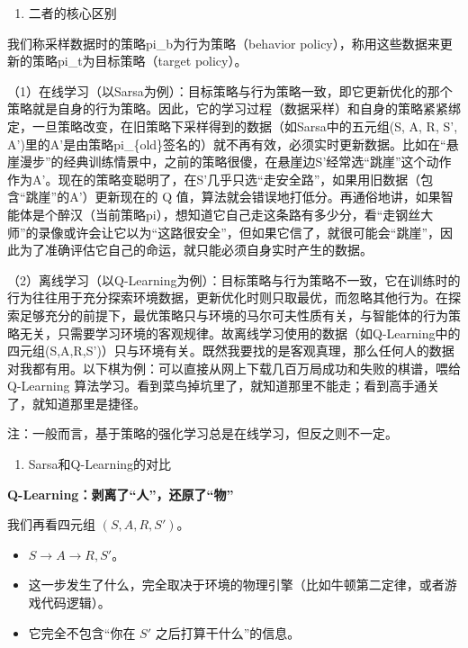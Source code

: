 \begin{enumerate}
\def\labelenumi{\arabic{enumi}.}
\tightlist
\item
  二者的核心区别
\end{enumerate}

我们称采样数据时的策略pi\_b为行为策略（behavior policy），称用这些数据来更新的策略pi\_t为目标策略（target policy）。

（1）在线学习（以Sarsa为例）：目标策略与行为策略一致，即它更新优化的那个策略就是自身的行为策略。因此，它的学习过程（数据采样）和自身的策略紧紧绑定，一旦策略改变，在旧策略下采样得到的数据（如Sarsa中的五元组(S, A, R, S', A')里的A'是由策略pi\_\{old\}签名的）就不再有效，必须实时更新数据。比如在``悬崖漫步''的经典训练情景中，之前的策略很傻，在悬崖边S'经常选``跳崖''这个动作作为A'。现在的策略变聪明了，在S'几乎只选``走安全路''，如果用旧数据（包含``跳崖''的A'）更新现在的 Q 值，算法就会错误地打低分。再通俗地讲，如果智能体是个醉汉（当前策略pi），想知道它自己走这条路有多少分，看``走钢丝大师''的录像或许会让它以为``这路很安全''，但如果它信了，就很可能会``跳崖''，因此为了准确评估它自己的命运，就只能必须自身实时产生的数据。

（2）离线学习（以Q-Learning为例）：目标策略与行为策略不一致，它在训练时的行为往往用于充分探索环境数据，更新优化时则只取最优，而忽略其他行为。在探索足够充分的前提下，最优策略只与环境的马尔可夫性质有关，与智能体的行为策略无关，只需要学习环境的客观规律。故离线学习使用的数据（如Q-Learning中的四元组(S,A,R,S')）只与环境有关。既然我要找的是客观真理，那么任何人的数据对我都有用。以下棋为例：可以直接从网上下载几百万局成功和失败的棋谱，喂给 Q-Learning 算法学习。看到菜鸟掉坑里了，就知道那里不能走；看到高手通关了，就知道那里是捷径。

注：一般而言，基于策略的强化学习总是在线学习，但反之则不一定。

\begin{enumerate}
\def\labelenumi{\arabic{enumi}.}
\setcounter{enumi}{1}
\tightlist
\item
  Sarsa和Q-Learning的对比
\end{enumerate}

\textbf{Q-Learning：剥离了``人''，还原了``物''}

我们再看四元组 \((S,A,R,S')\)。

\begin{itemize}
\tightlist
\item
  \(S\to A\to R,S'\)。
\item
  这一步发生了什么，完全取决于环境的物理引擎（比如牛顿第二定律，或者游戏代码逻辑）。
\item
  它完全不包含``你在 \(S'\) 之后打算干什么''的信息。
\end{itemize}


